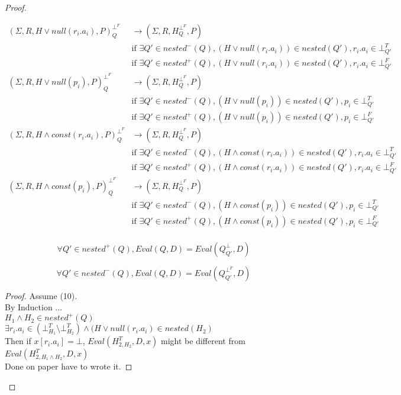\begin{proof}
	
	\begin{mydef}
		\begin{align*}
			(\Sigma,R,H \lor null(r_i.a_i),P)^{\bot^F}_Q & \rightarrow (\Sigma,R,H^{\bot^F}_{Q},P) \\
			& \mbox{if } \exists Q' \in nested^-(Q), (H\lor null(r_i.a_i)) \in nested(Q'), r_i.a_i \in \bot^T_{Q'} \\
			& \mbox{if } \exists Q' \in nested^+(Q), (H\lor null(r_i.a_i)) \in nested(Q'), r_i.a_i \in \bot^F_{Q'} \\
			(\Sigma,R,H \lor null(p_i),P)^{\bot^F}_Q & \rightarrow (\Sigma,R,H^{\bot^F}_{Q},P) \\
			& \mbox{if } \exists Q' \in nested^-(Q), (H\lor null(p_i)) \in nested(Q'), p_i \in \bot^T_{Q'} \\
			& \mbox{if } \exists Q' \in nested^+(Q), (H\lor null(p_i)) \in nested(Q'), p_i \in \bot^F_{Q'} \\
			(\Sigma,R,H \land const(r_i.a_i),P)^{\bot^F}_Q & \rightarrow (\Sigma,R,H^{\bot^F}_{Q},P) \\
			& \mbox{if } \exists Q' \in nested^-(Q), (H\land const(r_i.a_i)) \in nested(Q'), r_i.a_i \in \bot^T_{Q'} \\
			& \mbox{if } \exists Q' \in nested^+(Q), (H\land const(r_i.a_i)) \in nested(Q'), r_i.a_i \in \bot^F_{Q'} \\
			(\Sigma,R,H \land const(p_i),P)^{\bot^F}_Q & \rightarrow (\Sigma,R,H^{\bot^F}_{Q},P) \\
			& \mbox{if } \exists Q' \in nested^-(Q), (H\land const(p_i)) \in nested(Q'), p_i \in \bot^T_{Q'} \\
			& \mbox{if } \exists Q' \in nested^+(Q), (H\land const(p_i)) \in nested(Q'), p_i \in \bot^F_{Q'} \\
		\end{align*}
	\end{mydef}
	
	\begin{myprop}
		$$\forall Q' \in nested^+(Q), Eval(Q,D) = Eval(Q^\bot_{Q'},D)$$
	\end{myprop}
	\begin{myprop}
		$$\forall Q' \in nested^-(Q), Eval(Q,D) = Eval(Q^{\bot^F}_{Q'},D)$$
	\end{myprop}
	
	\begin{proof}
		Assume (10).
		\\By Induction ...
		\\$H_1 \land H_2 \in nested^+(Q)$
		\\$\exists r_i.a_i \in (\bot^T_{H_1} \setminus \bot^T_{H_2}) \land (H\lor null(r_i.a_i)\in nested(H_2)$
		\\Then if $x[r_i.a_i] = \bot$, $Eval(H^T_{2,H_2},D,x)$ might be different from $Eval(H^T_{2,H_1\land H_2},D,x)$
		\\ Done on paper have to wrote it.
	\end{proof}
	
	
\end{proof}



